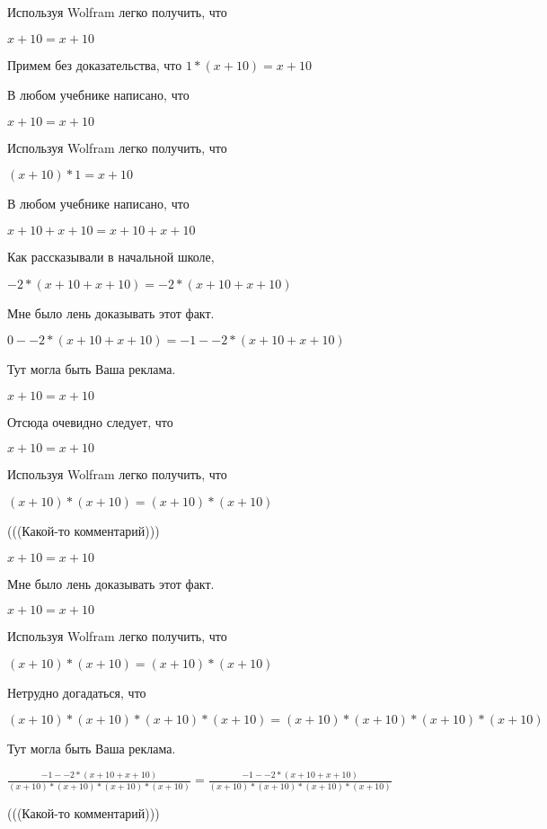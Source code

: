 \documentclass[12pt,a4paper,fleqn]{article}
\theoremstyle{definition}
\begin{document}
Используя Wolfram легко получить, что

$ x  +  10  =  x  +  10 $

Примем без доказательства, что
$ 1  * ( x  +  10 ) =  x  +  10 $

В любом учебнике написано, что

$ x  +  10  =  x  +  10 $

Используя Wolfram легко получить, что

$( x  +  10 ) *  1  =  x  +  10 $

В любом учебнике написано, что

$ x  +  10  +  x  +  10  =  x  +  10  +  x  +  10 $

Как рассказывали в начальной школе,

$ -2  * ( x  +  10  +  x  +  10 ) =  -2  * ( x  +  10  +  x  +  10 )$

Мне было лень доказывать этот факт.

$ 0  -  -2  * ( x  +  10  +  x  +  10 ) =  -1  -  -2  * ( x  +  10  +  x  +  10 )$

Тут могла быть Ваша реклама.

$ x  +  10  =  x  +  10 $

Отсюда очевидно следует, что

$ x  +  10  =  x  +  10 $

Используя Wolfram легко получить, что

$( x  +  10 ) * ( x  +  10 ) = ( x  +  10 ) * ( x  +  10 )$

(((Какой-то комментарий)))

$ x  +  10  =  x  +  10 $

Мне было лень доказывать этот факт.

$ x  +  10  =  x  +  10 $

Используя Wolfram легко получить, что

$( x  +  10 ) * ( x  +  10 ) = ( x  +  10 ) * ( x  +  10 )$

Нетрудно догадаться, что

$( x  +  10 ) * ( x  +  10 ) * ( x  +  10 ) * ( x  +  10 ) = ( x  +  10 ) * ( x  +  10 ) * ( x  +  10 ) * ( x  +  10 )$

Тут могла быть Ваша реклама.

$\frac{ -1  -  -2  * ( x  +  10  +  x  +  10 )}{( x  +  10 ) * ( x  +  10 ) * ( x  +  10 ) * ( x  +  10 )}
 = \frac{ -1  -  -2  * ( x  +  10  +  x  +  10 )}{( x  +  10 ) * ( x  +  10 ) * ( x  +  10 ) * ( x  +  10 )}
$

(((Какой-то комментарий)))
\end{document}
